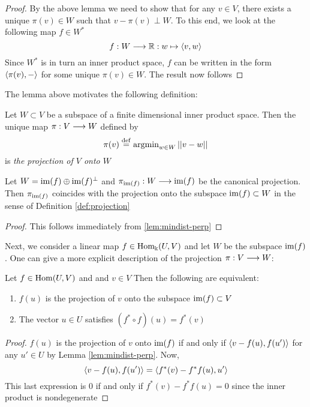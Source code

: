 \begin{proof}
	By the above lemma we need to show that for any $v \in V$, there exists a unique $\pi(v) \in W$ such that $v-\pi(v) \perp W$. To this end, we look at the following map $ f \in W^*$
	\[
	f: W \longrightarrow \mathbb{R}: w \mapsto \left\langle v,w\right\rangle
	\]
	Since $W^*$ is in turn an inner product space, $f$ can be written in the form $\left\langle \pi(v),-\right\rangle$ for some unique $\pi(v) \in W$. The result now follows
\end{proof}

The lemma above motivates the following definition:

\begin{definition}\label{def:projection}
	Let $W\subset V$ be a subspace of a finite dimensional inner product space. Then the unique map $\pi: V\longrightarrow W$ defined by 
	\[
	\pi(v) \stackrel{\operatorname{def}}{=} \operatorname{argmin}_{w \in W}\vert \vert v-w \vert \vert
	\]
	is \emph{the projection of $V$ onto $W$}
\end{definition}
\begin{corollary}\label{lem:projcoincide}
	Let $W=\operatorname{im}(f)\oplus \operatorname{im}(f)^{\perp}$ and $\pi_{\operatorname{im}(f)}:W\longrightarrow \operatorname{im}(f)$ be the canonical projection. Then $\pi_{\operatorname{im}(f)}$ coincides with the projection onto the subspace $\operatorname{im}(f)\subset W$ in the sense of Definition \ref{def:projection}
\end{corollary}

\begin{proof}
This follows immediately from \ref{lem:mindist-perp}
\end{proof}
\noindent Next, we consider a linear map $f \in \operatorname{Hom}_\Bbbk(U,V)$ and let $W$ be the subspace $\operatorname{im}(f)$. One can give a more explicit description of the projection $\pi: V\longrightarrow W$:

\begin{lemma}\label{lem:normaleq}
	Let $f \in \operatorname{Hom}(U,V)$ and and $v \in V$ Then the following are equivalent:
	\begin{enumerate}
		\item	$f(u)$ is the projection of $v$ onto the subspace $\operatorname{im}(f)\subset V$
		\item The vector $u \in U$ satisfies $(f^* \circ f)(u) = f^*(v)$	
	\end{enumerate}
\end{lemma}

\begin{proof}
	$f(u)$ is the projection of $v$ onto $\operatorname{im}(f)$ if and only if $\left\langle v-f(u),f(u')\right\rangle$ for any $u' \in U$ by Lemma \ref{lem:mindist-perp}. Now,
	\[
	\left\langle v-f(u),f(u')\right\rangle=\left\langle f^*(v)-f^*f(u),u'\right\rangle
	\]
	This last expression is $0$ if and only if $f^*(v)-f^*f(u)=0$ since the inner product is nondegenerate
\end{proof}

